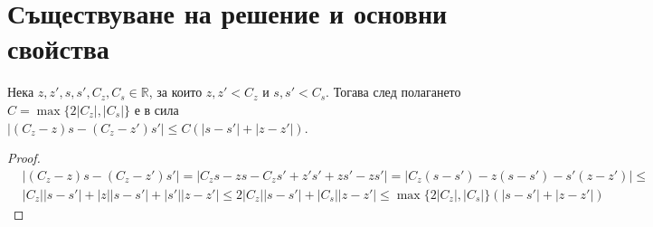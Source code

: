 \section{Съществуване на решение и основни свойства}
\begin{lemma}
  Нека $z, z', s, s', C_z, C_s \in \mathbb{R}$, за които $z, z' < C_z$ и $s, s' < C_s$. Тогава след полагането $C = \max\{2 |C_z|, |C_s|\}$ е в сила $|(C_z - z) s - (C_z - z') s'| \leq C (|s-s'| + |z - z'|)$.
\end{lemma}

\begin{proof}
  \begin{equation}
    \begin{split}
      &|(C_z - z) s - (C_z - z') s'| =
      |C_z s - z s - C_z s' + z' s' + z s' - z s'| =
      |C_z (s - s') - z (s - s') - s' (z - z')| \leq \\
      &|C_z| |s - s'| + |z| |s - s'| + |s'| |z - z'| \leq
      2 |C_z| |s - s'|  + |C_s| |z - z'| \leq
      \max\{2 |C_z|, |C_s|\} (|s-s'| + |z - z'|)
    \end{split}
    \end{equation}
    \end{proof}
